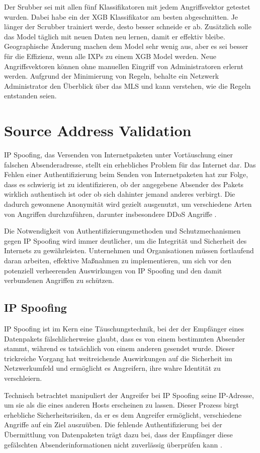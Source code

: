 \documentclass[sigplan,screen]{acmart}
\begin{document}
Der Srubber sei mit allen fünf Klassifikatoren mit jedem Angriffsvektor getestet wurden. Dabei habe ein der XGB Klassifikator am besten abgeschnitten. Je länger der Scrubber trainiert werde, desto besser schneide er ab. Zusätzlich solle das Model täglich mit neuen Daten neu lernen, damit er effektiv bleibe. Geographische Änderung machen dem Model sehr wenig aus, aber es sei besser für die Effizienz, wenn alle IXPs zu einem XGB Model werden.
Neue Angriffsvektoren können ohne manuellen Eingriff von Administratoren erlernt werden. Aufgrund der Minimierung von Regeln, behalte ein Netzwerk Administrator den Überblick über das MLS und kann verstehen, wie die Regeln entstanden seien.


\section{Source Address Validation}
IP Spoofing, das Versenden von Internetpaketen unter Vortäuschung einer falschen Absenderadresse, stellt ein erhebliches Problem für das Internet dar. Das Fehlen einer Authentifizierung beim Senden von Internetpaketen hat zur Folge, dass es schwierig ist zu identifizieren, ob der angegebene Absender des Pakets wirklich authentisch ist oder ob sich dahinter jemand anderes verbirgt. Die dadurch gewonnene Anonymität wird gezielt ausgenutzt, um verschiedene Arten von Angriffen durchzuführen, darunter insbesondere DDoS Angriffe \cite{Kor01, Gorilla01}. 

Die Notwendigkeit von Authentifizierungsmethoden und Schutzmechanismen gegen IP Spoofing wird immer deutlicher, um die Integrität und Sicherheit des Internets zu gewährleisten. Unternehmen und Organisationen müssen fortlaufend daran arbeiten, effektive Maßnahmen zu implementieren, um sich vor den potenziell verheerenden Auswirkungen von IP Spoofing und den damit verbundenen Angriffen zu schützen.

\subsection{IP Spoofing}
IP Spoofing ist im Kern eine Täuschungstechnik, bei der der Empfänger eines Datenpakets fälschlicherweise glaubt, dass es von einem bestimmten Absender stammt, während es tatsächlich von einem anderen gesendet wurde. Dieser trickreiche Vorgang hat weitreichende Auswirkungen auf die Sicherheit im Netzwerkumfeld und ermöglicht es Angreifern, ihre wahre Identität zu verschleiern.

Technisch betrachtet manipuliert der Angreifer bei IP Spoofing seine IP-Adresse, um sie als die eines anderen Hosts erscheinen zu lassen. Dieser Prozess birgt erhebliche Sicherheitsrisiken, da er es dem Angreifer ermöglicht, verschiedene Angriffe auf ein Ziel auszuüben. Die fehlende Authentifizierung bei der Übermittlung von Datenpaketen trägt dazu bei, dass der Empfänger diese gefälschten Absenderinformationen nicht zuverlässig überprüfen kann \cite{Beverly01}.
\end{document}
